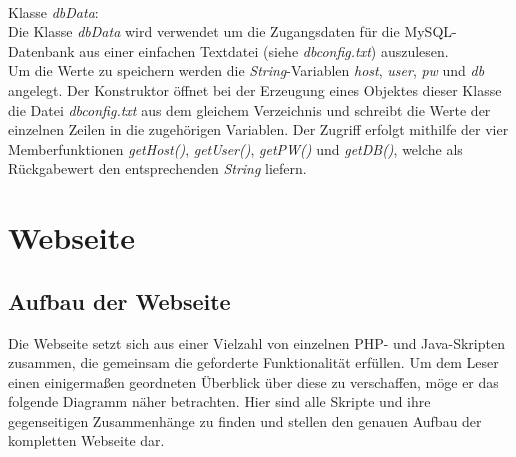 \documentclass[fontsize = 12pt, paper = a4]{scrreprt}
\begin{document}
\\
Klasse \textit{dbData}:\\
Die Klasse \textit{dbData} wird verwendet um die Zugangsdaten für die MySQL-Datenbank aus einer einfachen Textdatei (siehe \textit{dbconfig.txt}) auszulesen.\\
Um die Werte zu speichern werden die \textit{String}-Variablen \textit{host}, \textit{user}, \textit{pw} und \textit{db} angelegt. Der Konstruktor öffnet bei der Erzeugung eines Objektes dieser Klasse die Datei \textit{dbconfig.txt} aus dem  gleichem Verzeichnis und schreibt die Werte der einzelnen Zeilen in die zugehörigen Variablen.
Der Zugriff erfolgt mithilfe der vier Memberfunktionen \textit{getHost()}, \textit{getUser()}, \textit{getPW()} und \textit{getDB()}, welche als Rückgabewert den entsprechenden \textit{String} liefern.


\newpage





\section{Webseite}


\subsection{Aufbau der Webseite}
Die Webseite setzt sich aus einer Vielzahl von einzelnen PHP- und Java-Skripten zusammen, die gemeinsam die geforderte Funktionalität erfüllen. Um dem Leser einen einigermaßen geordneten Überblick über diese zu verschaffen, möge er das folgende Diagramm näher betrachten. Hier sind alle Skripte und ihre gegenseitigen Zusammenhänge zu finden und stellen den genauen Aufbau der kompletten Webseite dar.
\end{document}
